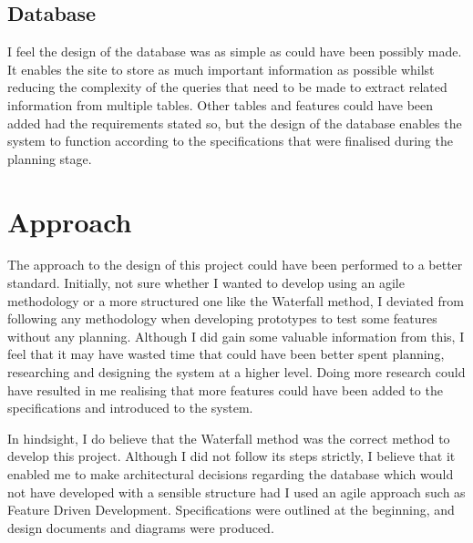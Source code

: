 \subsection{Database}
I feel the design of the database was as simple as could have been possibly made. It enables the site to store as much important information as possible whilst reducing the complexity of the queries that need to be made to extract related information from multiple tables. Other tables and features could have been added had the requirements stated so, but the design of the database enables the system to function according to the specifications that were finalised during the planning stage.

\section{Approach}
The approach to the design of this project could have been performed to a better standard. Initially, not sure whether I wanted to develop using an agile methodology or a more structured one like the Waterfall method, I deviated from following any methodology when developing prototypes to test some features without any planning. Although I did gain some valuable information from this, I feel that it may have wasted time that could have been better spent planning, researching and designing the system at a higher level. Doing more research could have resulted in me realising that more features could have been added to the specifications and introduced to the system.

In hindsight, I do believe that the Waterfall method was the correct method to develop this project. Although I did not follow its steps strictly, I believe that it enabled me to make architectural decisions regarding the database which would not have developed with a sensible structure had I used an agile approach such as Feature Driven Development. Specifications were outlined at the beginning, and design documents and diagrams were produced. 
